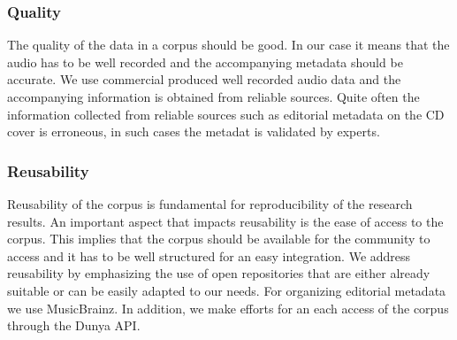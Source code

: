 \subsubsection{Quality}

The quality of the data in a corpus should be good. In our case it means that the audio has to be well recorded and the accompanying metadata should be accurate. We use commercial produced well recorded audio data and the accompanying information is obtained from reliable sources. Quite often the information collected from reliable sources such as editorial metadata on the CD cover is erroneous, in such cases the metadat is validated by experts. 


\subsubsection{Reusability}

Reusability of the corpus is fundamental for reproducibility of the research results. An important aspect that impacts reusability is the ease of access to the corpus. This implies that the corpus should be available for the community to access and it has to be well structured for an easy integration. We address reusability by emphasizing the use of open repositories that are either already suitable or can be easily adapted to our needs. For organizing editorial metadata we use MusicBrainz. In addition, we make efforts for an each access of the corpus through the Dunya API.







